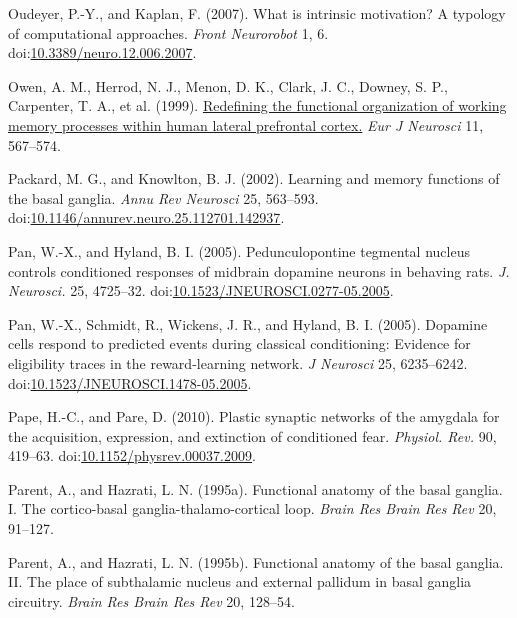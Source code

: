 \documentclass[
  11pt,
  a4paper,
]{scrbook}
\newlength{\cslhangindent}
\newenvironment{CSLReferences}[2] %
 {\begin{list}{}{%
  \setlength{\itemindent}{0pt}
  \setlength{\leftmargin}{0pt}
  \setlength{\parsep}{0pt}
  \ifodd #1
   \setlength{\leftmargin}{\cslhangindent}
   \setlength{\itemindent}{-1\cslhangindent}
  \fi
  \setlength{\itemsep}{#2\baselineskip}}}
 {\end{list}}
\begin{document}
\begin{CSLReferences}{1}{1}
Oudeyer, P.-Y., and Kaplan, F. (2007). What is intrinsic motivation? A
typology of computational approaches. \emph{Front Neurorobot} 1, 6.
doi:\href{https://doi.org/10.3389/neuro.12.006.2007}{10.3389/neuro.12.006.2007}.

Owen, A. M., Herrod, N. J., Menon, D. K., Clark, J. C., Downey, S. P.,
Carpenter, T. A., et al. (1999).
\href{https://www.ncbi.nlm.nih.gov/pubmed/10051756}{Redefining the
functional organization of working memory processes within human lateral
prefrontal cortex.} \emph{Eur J Neurosci} 11, 567--574.

Packard, M. G., and Knowlton, B. J. (2002). Learning and memory
functions of the basal ganglia. \emph{Annu Rev Neurosci} 25, 563--593.
doi:\href{https://doi.org/10.1146/annurev.neuro.25.112701.142937}{10.1146/annurev.neuro.25.112701.142937}.

Pan, W.-X., and Hyland, B. I. (2005). {Pedunculopontine tegmental
nucleus controls conditioned responses of midbrain dopamine neurons in
behaving rats.} \emph{J. Neurosci.} 25, 4725--32.
doi:\href{https://doi.org/10.1523/JNEUROSCI.0277-05.2005}{10.1523/JNEUROSCI.0277-05.2005}.

Pan, W.-X., Schmidt, R., Wickens, J. R., and Hyland, B. I. (2005).
Dopamine cells respond to predicted events during classical
conditioning: Evidence for eligibility traces in the reward-learning
network. \emph{J Neurosci} 25, 6235--6242.
doi:\href{https://doi.org/10.1523/JNEUROSCI.1478-05.2005}{10.1523/JNEUROSCI.1478-05.2005}.

Pape, H.-C., and Pare, D. (2010). {Plastic synaptic networks of the
amygdala for the acquisition, expression, and extinction of conditioned
fear.} \emph{Physiol. Rev.} 90, 419--63.
doi:\href{https://doi.org/10.1152/physrev.00037.2009}{10.1152/physrev.00037.2009}.

Parent, A., and Hazrati, L. N. (1995a). Functional anatomy of the basal
ganglia. {I. The} cortico-basal ganglia-thalamo-cortical loop.
\emph{Brain Res Brain Res Rev} 20, 91--127.

Parent, A., and Hazrati, L. N. (1995b). Functional anatomy of the basal
ganglia. {II. The} place of subthalamic nucleus and external pallidum in
basal ganglia circuitry. \emph{Brain Res Brain Res Rev} 20, 128--54.


\end{CSLReferences}
\end{document}
